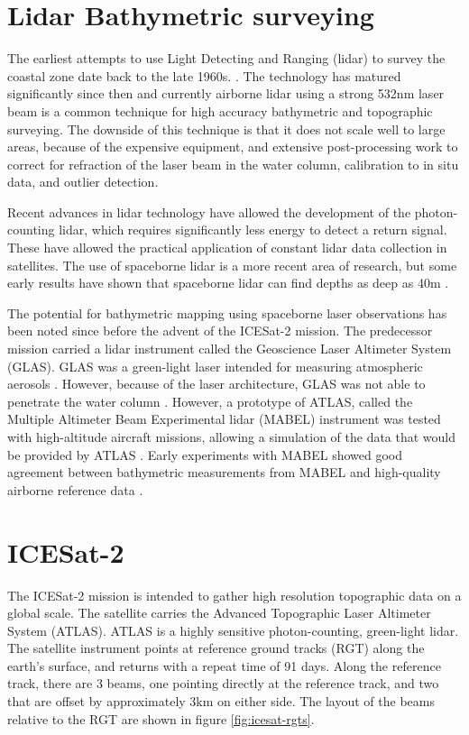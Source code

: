 \section{Lidar Bathymetric surveying}

The earliest attempts to use Light Detecting and Ranging (lidar) to survey the coastal zone date back to the late 1960s. \parencite{Bailly2016}. The technology has matured significantly since then and currently airborne lidar using a strong 532nm laser beam is a common technique for high accuracy bathymetric and topographic surveying. The downside of this technique is that it does not scale well to large areas, because of the expensive equipment, and extensive post-processing work to correct for refraction of the laser beam in the water column, calibration to in situ data, and outlier detection.

Recent advances in lidar technology have allowed the development of the photon-counting lidar, which requires significantly less energy to detect a return signal. These have allowed the practical application of constant lidar data collection in satellites. The use of spaceborne lidar is a more recent area of research, but some early results have shown that spaceborne lidar can find depths as deep as 40m \parencite{Parrish2019}.

The potential for bathymetric mapping using spaceborne laser observations has been noted since before the advent of the ICESat-2 mission. The predecessor mission carried a lidar instrument called the Geoscience Laser Altimeter System (GLAS). GLAS was a green-light laser intended for measuring atmospheric aerosols \parencite{Abshire2005}. However, because of the laser architecture, GLAS was not able to penetrate the water column \parencite{Forfinski-Sarkozi2016}. However, a prototype of ATLAS, called the Multiple Altimeter Beam Experimental lidar (MABEL) instrument was tested with high-altitude aircraft missions, allowing a simulation of the data that would be provided by ATLAS \parencite{Mcgill2013}. Early experiments with MABEL showed good agreement between bathymetric measurements from MABEL and high-quality airborne reference data \parencite{Jasinski2016,Forfinski-Sarkozi2016}.


\section{ICESat-2}

The ICESat-2 mission is intended to gather high resolution topographic data on a global scale. The satellite carries the Advanced Topographic Laser Altimeter System (ATLAS). ATLAS is a highly sensitive photon-counting, green-light lidar. The satellite instrument points at reference ground tracks (RGT) along the earth's surface, and returns with a repeat time of 91 days. Along the reference track, there are 3 beams, one pointing directly at the reference track, and two that are offset by approximately 3km on either side. The layout of the beams relative to the RGT are shown in figure \ref{fig:icesat-rgts}.


